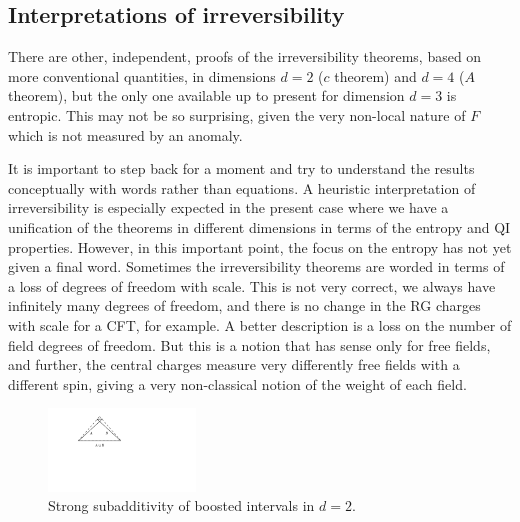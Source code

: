 \documentclass[11pt]{article}
\numberwithin{equation}{section}
\begin{document}
\subsection{Interpretations of irreversibility}
There are other, independent, proofs of the irreversibility theorems, based on more conventional quantities,  in dimensions $d=2$ ($c$ theorem) and $d=4$ ($A$ theorem), but the only one available up to present for dimension $d=3$ is entropic. This may not be so surprising, given the very non-local nature of $F$ which is not measured by an anomaly. 

It is important to step back for a moment and try to understand the results conceptually with words rather than equations. A heuristic interpretation of irreversibility is especially expected in the present case where we have a unification of the theorems in different dimensions in terms of the entropy and QI properties. However, in this important point, the focus on the entropy has not yet given a final word. 
Sometimes the irreversibility theorems are worded in terms of a loss of degrees of freedom with scale. This is not very correct, we always have infinitely many degrees of freedom, and there is no change in the RG charges with scale for a CFT, for example. A better description is a loss on the number of field degrees of freedom. But this is a notion that has sense only for free fields, and further, the central charges measure very differently free fields with a different spin, giving a very non-classical notion of the weight of each field.   

\begin{figure}[t]
\begin{center}
\includegraphics[width=0.35\textwidth]{triangulo.pdf} 
\caption{Strong subadditivity of boosted intervals in $d=2$.}
\label{triangle}
\end{center}
\end{figure}
\end{document}
